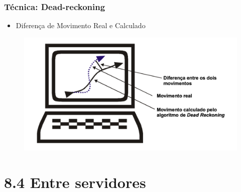 \documentclass{beamer}
\begin{document}
\begin{frame}
  \frametitle{Técnica: Dead-reckoning}
  \begin{itemize}
    \item Diferença de Movimento Real e Calculado
  \end{itemize}
  \begin{figure}[h]
    \centering
    \vspace{-18pt}
    \includegraphics[width=1.03\textwidth]{imagem_DeadreckoningDiferenca.png}
    \vspace{-20pt}
  \end{figure}
  \begin{flushright}
    \scriptsize
    \cite{Eduardo2002}
  \end{flushright}
\end{frame}


\section{8.4 Entre servidores}
\end{document}
